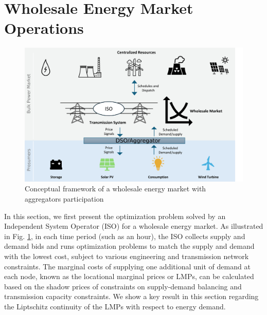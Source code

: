 \documentclass{article}
\theoremstyle{definition}
\theoremstyle{plain}
\begin{document}


\section{Wholesale Energy Market Operations}
\label{sec:Wholesale}
\begin{figure}[!ht]
	\begin{center}
		\includegraphics[scale=0.11]{concept.png}
		\caption{Conceptual framework of a wholesale energy market with aggregators participation}
		\label{fig:MktOper}
	\end{center}
\end{figure}
In this section, we first present the optimization problem solved by an Independent System Operator (ISO) for a wholesale energy market. As illustrated in Fig. \ref{fig:MktOper}, in each time period (such as an hour), the ISO collects supply and demand bids and runs optimization problems to match the supply and demand with the lowest cost, subject to various engineering and transmission network constraints. The marginal costs of supplying one additional unit of demand at each node, known as the locational marginal prices or LMPs, can be calculated based on the shadow prices of constraints on supply-demand balancing and transmission capacity constraints. We show a key result in this section regarding the Liptschitz continuity of the LMPs with respect to energy demand.   
\end{document}

